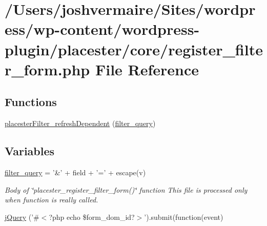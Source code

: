 \hypertarget{register__filter__form_8php}{
\section{/Users/joshvermaire/Sites/wordpress/wp-\/content/wordpress-\/plugin/placester/core/register\_\-filter\_\-form.php File Reference}
\label{d9/d2a/register__filter__form_8php}
}
\subsection*{Functions}
\begin{DoxyCompactItemize}
\item 
\hyperlink{register__filter__form_8php_acb22b4ccbcc97b312b1d77d1d8cff004}{placesterFilter\_\-refreshDependent} (\hyperlink{register__filter__form_8php_a4036aaa144d24a8531caec315324fb00}{filter\_\-query})
\end{DoxyCompactItemize}
\subsection*{Variables}
\begin{DoxyCompactItemize}
\item 
\hyperlink{register__filter__form_8php_a4036aaa144d24a8531caec315324fb00}{filter\_\-query} = '\&' + field + '=' + escape(v)
\begin{DoxyCompactList}\small\item\em Body of \char`\"{}placester\_\-register\_\-filter\_\-form()\char`\"{} function This file is processed only when function is really called. \end{DoxyCompactList}\item 
\hyperlink{register__filter__form_8php_a266e721a2145243761e6379f76bb58d5}{jQuery} ('\#$<$?php echo \$form\_\-dom\_\-id?$>$').submit(function(event)
\end{DoxyCompactItemize}


